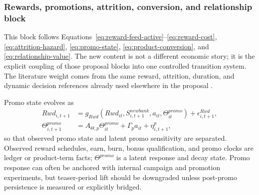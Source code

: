\documentclass[11pt]{article}
\newcommand{\1}{\mathbf{1}}
\begin{document}
\subsubsection{Rewards, promotions, attrition, conversion, and relationship block}
\label{subsec:state-space-promo-attrition}

This block follows Equations~\eqref{eq:reward-feed-active}--\eqref{eq:reward-cost},
\eqref{eq:attrition-hazard}, \eqref{eq:promo-state},
\eqref{eq:product-conversion}, and \eqref{eq:relationship-value}. The new
content is not a different economic story; it is the explicit coupling of those
proposal blocks into one controlled transition system. The literature weight
comes from the same reward, attrition, duration, and dynamic decision references
already used elsewhere in the proposal
\citep{agarwal2010rewards,schmittlein1987counting,fader2005bgnbd,
bolton1998duration,puterman1994mdp,murphy2003dynamic}.

Promo state evolves as
\begin{align}
  Rwd_{i,t+1}
    &= g_{Rwd}(Rwd_{it},S^{newbank}_{i,t+1},a_{it},\Theta^{promo}_{it})
       + \epsilon^{Rwd}_{i,t+1},
       \label{eq:ss-reward-transition}\\
  \Theta^{promo}_{i,t+1}
    &= A_{\Theta,p}\Theta^{promo}_{it} + \Gamma_p a_{it} + \eta^p_{i,t+1},
       \label{eq:ss-promo-latent}
\end{align}
so that observed promo state and latent promo sensitivity are separated.
Observed reward schedules, earn, burn, bonus qualification, and promo clocks
are ledger or product-term facts; $\Theta^{promo}$ is a latent response and
decay state. Promo response can often be anchored with internal campaign and
promotion experiments, but teaser-period lift should be downgraded unless
post-promo persistence is measured or explicitly bridged.
\end{document}
